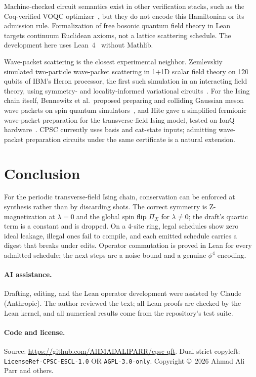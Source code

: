 \documentclass[11pt]{article}
\theoremstyle{definition}
\newcommand{\lean}[1]{\texttt{#1}}
\newcommand{\PiX}{\Pi_X}
\begin{document}
Machine-checked circuit semantics exist in other verification stacks, such as the Coq-verified VOQC optimizer~\cite{voqc}, but they do not encode this Hamiltonian or its admission rule. Formalization of free bosonic quantum field theory in Lean~\cite{douglas2026} targets continuum Euclidean axioms, not a lattice scattering schedule. The development here uses Lean~4~\cite{lean4} without Mathlib.

Wave-packet scattering is the closest experimental neighbor. Zemlevskiy simulated two-particle wave-packet scattering in 1+1D scalar field theory on 120 qubits of IBM's Heron processor, the first such simulation in an interacting field theory, using symmetry- and locality-informed variational circuits~\cite{zemlevskiy2024}. For the Ising chain itself, Bennewitz et al.\ proposed preparing and colliding Gaussian meson wave packets on spin quantum simulators~\cite{bennewitz2024}, and Hite gave a simplified fermionic wave-packet preparation for the transverse-field Ising model, tested on IonQ hardware~\cite{hite2025}. CPSC currently uses basis and cat-state inputs; admitting wave-packet preparation circuits under the same certificate is a natural extension.

\section{Conclusion}

For the periodic transverse-field Ising chain, conservation can be enforced at synthesis rather than by discarding shots. The correct symmetry is Z-magnetization at $\lambda = 0$ and the global spin flip $\PiX$ for $\lambda \neq 0$; the draft's quartic term is a constant and is dropped. On a 4-site ring, legal schedules show zero ideal leakage, illegal ones fail to compile, and each emitted schedule carries a digest that breaks under edits. Operator commutation is proved in Lean for every admitted schedule; the next steps are a noise bound and a genuine $\phi^4$ encoding.

\paragraph{AI assistance.}
Drafting, editing, and the Lean operator development were assisted by Claude (Anthropic). The author reviewed the text; all Lean proofs are checked by the Lean kernel, and all numerical results come from the repository's test suite.

\paragraph{Code and license.}
Source: \url{https://github.com/AHMADALIPARR/cpsc-qft}. Dual strict copyleft: \lean{LicenseRef-CPSC-ESCL-1.0} OR \lean{AGPL-3.0-only}. Copyright \copyright\ 2026 Ahmad Ali Parr and others.
\end{document}
